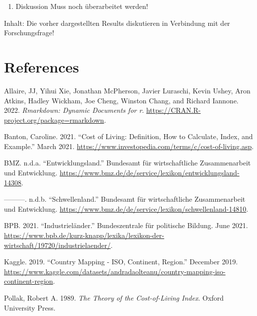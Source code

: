 \documentclass[
  11pt,
  a4paper,
  twoside]{scrbook}
\providecommand{\tightlist}{%
  \setlength{\itemsep}{0pt}\setlength{\parskip}{0pt}}
\newlength{\cslhangindent}
\newlength{\cslentryspacingunit} %
\newenvironment{CSLReferences}[2] %
 {%
  \setlength{\parindent}{0pt}
  \ifodd #1
  \let\oldpar\par
  \def\par{\hangindent=\cslhangindent\oldpar}
  \fi
    \setlength{\parskip}{#2\cslentryspacingunit+5pt}
   }%
 {}
\begin{document}
\begin{enumerate}
\def\labelenumi{\arabic{enumi}.}
\setcounter{enumi}{4}
\tightlist
\item
  Diskussion
  Muss noch überarbeitet werden!
\end{enumerate}

Inhalt:
Die vorher dargestellten Results diskutieren in Verbindung mit der Forschungsfrage!

\pagebreak

\hypertarget{references}{%
\chapter*{References}\label{references}}

\hypertarget{refs}{}
\begin{CSLReferences}{1}{0}
\leavevmode{}%
Allaire, JJ, Yihui Xie, Jonathan McPherson, Javier Luraschi, Kevin Ushey, Aron Atkins, Hadley Wickham, Joe Cheng, Winston Chang, and Richard Iannone. 2022. \emph{Rmarkdown: Dynamic Documents for r}. \url{https://CRAN.R-project.org/package=rmarkdown}.

\leavevmode{}%
Banton, Caroline. 2021. {``Cost of Living: Definition, How to Calculate, Index, and Example.''} March 2021. \url{https://www.investopedia.com/terms/c/cost-of-living.asp}.

\leavevmode{}%
BMZ. n.d.a. {``Entwicklungsland.''} Bundesamt für wirtschaftliche Zusammenarbeit und Entwicklung. \url{https://www.bmz.de/de/service/lexikon/entwicklungsland-14308}.

\leavevmode{}%
---------. n.d.b. {``Schwellenland.''} Bundesamt für wirtschaftliche Zusammenarbeit und Entwicklung. \url{https://www.bmz.de/de/service/lexikon/schwellenland-14810}.

\leavevmode{}%
BPB. 2021. {``Industrieländer.''} Bundeszentrale für politische Bildung. June 2021. \url{https://www.bpb.de/kurz-knapp/lexika/lexikon-der-wirtschaft/19720/industrielaender/}.

\leavevmode{}%
Kaggle. 2019. {``Country Mapping - ISO, Continent, Region.''} December 2019. \url{https://www.kaggle.com/datasets/andradaolteanu/country-mapping-iso-continent-region}.

\leavevmode{}%
Pollak, Robert A. 1989. \emph{The Theory of the Cost-of-Living Index}. Oxford University Press.


\end{CSLReferences}
\end{document}

